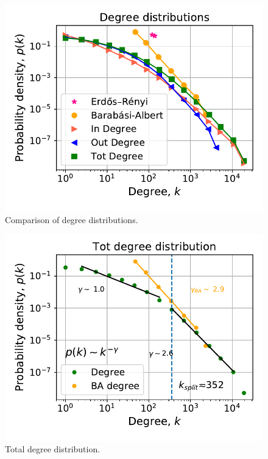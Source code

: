 \documentclass[11pt, twoside]{report}
\begin{document}
\begin{minipage}[b]{0.5\textwidth}
   \centering
    \begin{figure}[H]
      \includegraphics[width=\textwidth]{../../scripts/network_analysis/imgs/degree_distributions.pdf}
          \caption{Comparison of degree distributions.}
        \label{fig:degree_comparison}
\end{figure}
\end{minipage}
\begin{minipage}[b]{0.5\textwidth}
  \begin{figure}[H]
  \centering
  \includegraphics[width=\textwidth]{../../scripts/network_analysis/imgs/tot_degree_distribution.pdf}
        \caption{Total degree distribution.}
\label{fig:tot_degree}
\end{figure}
\end{minipage}
\end{document}
